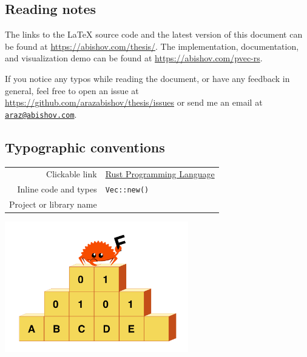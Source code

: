 \todo{$\ggg$}

\vspace*{2cm}
\thispagestyle{plain}

\begin{center}

    \section*{Reading notes}
    \begin{justify}
        The links to the LaTeX source code and the latest version of this document can be found at \url{https://abishov.com/thesis/}. The implementation, documentation, and visualization demo can be found at \url{https://abishov.com/pvec-rs}.

        If you notice any typos while reading the document, or have any feedback in general, feel free to open an issue at \url{https://github.com/arazabishov/thesis/issues} or send me an email at \href{mailto:araz@abishov.com}{\nolinkurl{araz@abishov.com}}.
    \end{justify}

    \subsection*{Typographic conventions}
    \begin{tabular}{ r l }
        Clickable link & \href{https://www.rust-lang.org/}{Rust Programming Language} \\
        Inline code and types & \texttt{Vec::new()} \\
        Project or library name & \pvecrs{} \\
    \end{tabular}

    \vspace*{1cm}
    \includegraphics[width=8cm, angle=0, trim=10 10 10 10, clip]{images/ferris-climbing.png}
\end{center}

